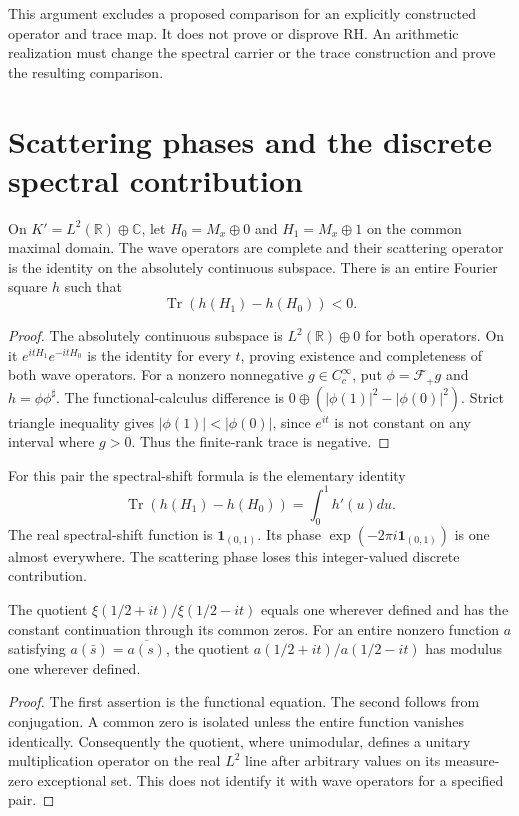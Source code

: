 This argument excludes a proposed comparison for an explicitly
constructed operator and trace map. It does not prove or disprove RH.
An arithmetic realization must change the spectral carrier or the
trace construction and prove the resulting comparison.

\section{Scattering phases and the discrete spectral contribution}

\begin{proposition}
\label{v4-arith:sc:unitary-counterexample}
On $K'=L^2(\mathbb R)\oplus\mathbb C$, let
$H_0=M_x\oplus0$ and $H_1=M_x\oplus1$ on the common maximal domain.
The wave operators are complete and their scattering operator is
the identity on the absolutely continuous subspace.
There is an entire Fourier square $h$ such that
\[
 \operatorname{Tr}(h(H_1)-h(H_0))<0.
\]
\end{proposition}
\begin{proof}
The absolutely continuous subspace is $L^2(\mathbb R)\oplus0$ for
both operators. On it $e^{itH_1}e^{-itH_0}$ is the identity for
every $t$, proving existence and completeness of both wave operators.
For a nonzero nonnegative $g\in C_c^\infty$, put
$\phi=\mathcal F_+g$ and $h=\phi\phi^\sharp$.
The functional-calculus difference is
$0\oplus(|\phi(1)|^2-|\phi(0)|^2)$.
Strict triangle inequality gives $|\phi(1)|<|\phi(0)|$, since
$e^{it}$ is not constant on any interval where $g>0$.
Thus the finite-rank trace is negative.
\end{proof}

For this pair the spectral-shift formula is the elementary identity
\[
 \operatorname{Tr}(h(H_1)-h(H_0))
 =\int_0^1h'(u)du.
\]
The real spectral-shift function is $\mathbf1_{(0,1)}$.
Its phase $\exp(-2\pi i\mathbf1_{(0,1)})$ is one almost everywhere.
The scattering phase loses this integer-valued discrete contribution.

\begin{proposition}
\label{v4-arith:sc:phase}
The quotient $\xi(1/2+it)/\xi(1/2-it)$ equals one wherever defined
and has the constant continuation through its common zeros.
For an entire nonzero function $a$ satisfying
$a(\bar s)=\overline{a(s)}$, the quotient
$a(1/2+it)/a(1/2-it)$ has modulus one wherever defined.
\end{proposition}
\begin{proof}
The first assertion is the functional equation.
The second follows from conjugation. A common zero is isolated
unless the entire function vanishes identically. Consequently the
quotient, where unimodular, defines a unitary multiplication
operator on the real $L^2$ line after arbitrary values on its
measure-zero exceptional set. This does not identify it with wave
operators for a specified pair.
\end{proof}

